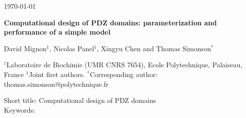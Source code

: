 \documentclass[12pt]{article}
\begin{document}
 

\parindent 0mm

\hfill \today

\vspace{5cm}

\begin{center}

\Large 
 
{\bf Computational design of PDZ domains: parameterization and performance of a simple model}
 
\vspace{1cm}

\normalsize

David Mignon$^1$, Nicolas Panel$^1$, Xingyu Chen and Thomas Simonson$^{\ast}$
 
\vspace{1cm}

$^{\dag}$Laboratoire de Biochimie (UMR CNRS 7654), Ecole Polytechnique, Palaiseau, France 
$^1$Joint first authors. $^{\ast}$Corresponding author: thomas.simonson@polytechnique.fr 

\end{center} 

\vfill

Short title: Computational design of PDZ domains \\
Keywords: 

\pagebreak
\end{document}
